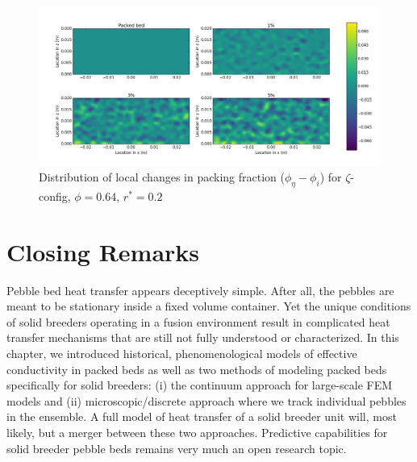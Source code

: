 \documentclass[11pt]{report} %
\begin{document}
\begin{figure}[!t]
    \centering
    \includegraphics[width = \textwidth]{images/z-62-r125-1-deltas.png}
    \caption{Distribution of local changes in packing fraction ($\phi_{\eta} - \phi_i$) for $\zeta$-config, $\phi = 0.64$, $r^* = 0.2$}\label{fig:z-64-r125-deltas}
\end{figure}

\FloatBarrier
\section{Closing Remarks}

Pebble bed heat transfer appears deceptively simple. After all, the pebbles are meant to be stationary inside a fixed volume container. Yet the unique conditions of solid breeders operating in a fusion environment result in complicated heat transfer mechanisms that are still not fully understood or characterized. In this chapter, we introduced historical, phenomenological models of effective conductivity in packed beds as well as two methods of modeling packed beds specifically for solid breeders: (i) the continuum approach for large-scale FEM models and (ii) microscopic/discrete approach where we track individual pebbles in the ensemble. A full model of heat transfer of a solid breeder unit will, most likely, but a merger between these two approaches. Predictive capabilities for solid breeder pebble beds remains very much an open research topic.





\end{document}
